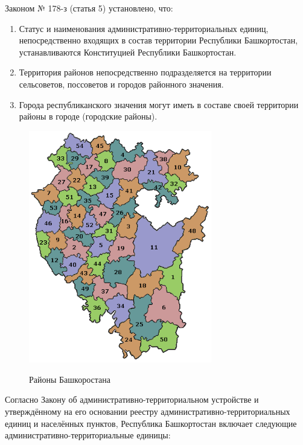 Законом № 178-з (статья 5) установлено, что:

\begin{enumerate}
	\item Статус и наименования административно-территориальных единиц, непосредственно входящих в состав территории Республики Башкортостан, устанавливаются Конституцией Республики Башкортостан.
	\item Территория районов непосредственно подразделяется на территории сельсоветов, поссоветов и городов районного значения.
	\item Города республиканского значения могут иметь в составе своей территории районы в городе (городские районы).
\end{enumerate}

\begin{figure}[h!]
	\begin{center}
		{\includegraphics[width=80mm]{pics/alina/admin.png}}
		\caption{Районы Башкоростана}
	\end{center}
\end{figure}


Согласно Закону об административно-территориальном устройстве и утверждённому на его основании реестру административно-территориальных единиц и населённых пунктов, Республика Башкортостан включает следующие административно-территориальные единицы:

